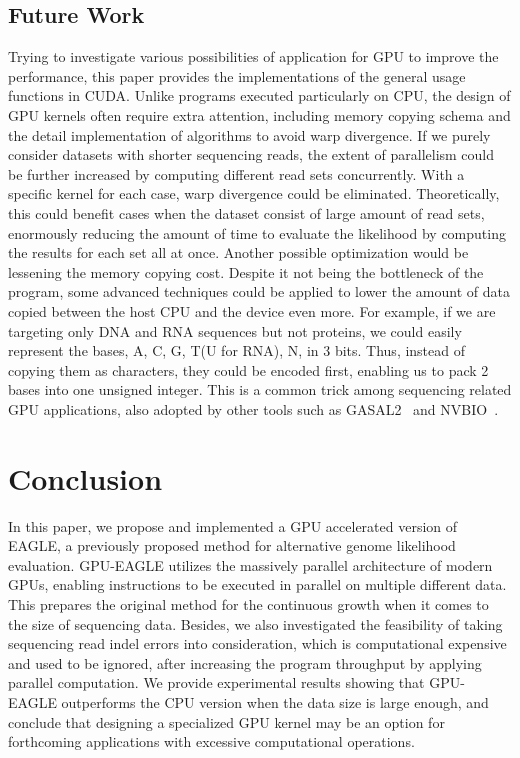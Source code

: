 \documentclass{PHlab-thesis}
\begin{document}
\section{Future Work}
Trying to investigate various possibilities of application for GPU to improve the performance, this paper provides the implementations of the general usage functions in CUDA. Unlike programs executed particularly on CPU, the design of GPU kernels often require extra attention, including memory copying schema and the detail implementation of algorithms to avoid warp divergence. If we purely consider datasets with shorter sequencing reads, the extent of parallelism could be further increased by computing different read sets concurrently. With a specific kernel for each case, warp divergence could be eliminated. Theoretically, this could benefit cases when the dataset consist of large amount of read sets, enormously reducing the amount of time to evaluate the likelihood by computing the results for each set all at once. Another possible optimization would be lessening the memory copying cost. Despite it not being the bottleneck of the program, some advanced techniques could be applied to lower the amount of data copied between the host CPU and the device even more. For example, if we are targeting only DNA and RNA sequences but not proteins, we could easily represent the bases, A, C, G, T(U for RNA), N, in 3 bits. Thus, instead of copying them as characters, they could be encoded first, enabling us to pack 2 bases into one unsigned integer. This is a common trick among sequencing related GPU applications, also adopted by other tools such as GASAL2~\cite{ahmed2019gasal2} and NVBIO~\cite{nvbio2015}.

\chapter{Conclusion}
In this paper, we propose and implemented a GPU accelerated version of EAGLE, a previously proposed method for alternative genome likelihood evaluation. GPU-EAGLE utilizes the massively parallel architecture of modern GPUs, enabling instructions to be executed in parallel on multiple different data. This prepares the original method for the continuous growth when it comes to the size of sequencing data. Besides, we also investigated the feasibility of taking sequencing read indel errors into consideration, which is computational expensive and used to be ignored, after increasing the program throughput by applying parallel computation. We provide experimental results showing that GPU-EAGLE outperforms the CPU version when the data size is large enough, and conclude that designing a specialized GPU kernel may be an option for forthcoming applications with excessive computational operations.

\newpage
{}
\printbibliography
\end{document}
